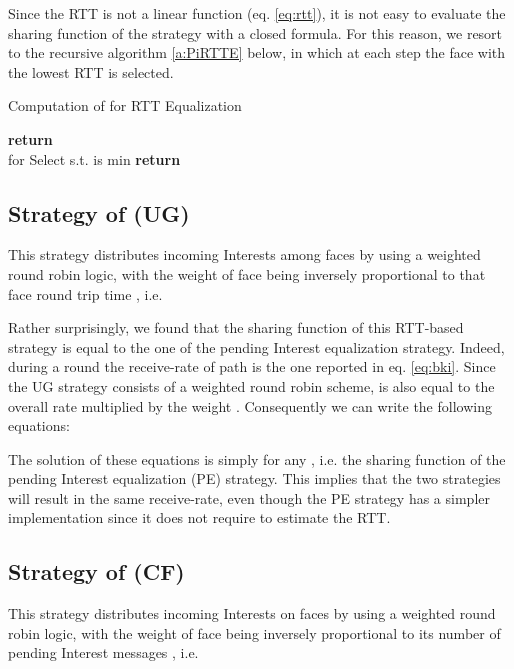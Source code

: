 \documentclass{sig-alternate-10pt}
\begin{document}
Since the RTT is not a linear function (eq. \ref{eq:rtt}), it is not easy to evaluate the sharing function  of the strategy with a closed formula. For this reason, we resort to the recursive algorithm \ref{a:PiRTTE} below, in which at each step the face with the lowest RTT is selected.



\begin{algorithm}
\caption{Computation of  for RTT Equalization}
\label{a:PiRTTE}
\begin{algorithmic}[1]
\State \textbf{return} 
\EndProcedure
\\
\State  for 
\State 
\For {}
\State Select  s.t.  is min
\State 
\EndFor
\State \textbf{return} 
\EndProcedure
\end{algorithmic}
\end{algorithm}


\subsection{Strategy of \cite{udugama} (UG)}
\label{s:ug}
This strategy distributes incoming Interests among faces by using a weighted round robin logic, with the weight  of face  being inversely proportional to that face round trip time , i.e.



Rather surprisingly, we found that the sharing function  of this RTT-based strategy is equal to the one of the pending Interest equalization strategy. Indeed, during a round  the receive-rate  of path  is the one reported in eq. \ref{eq:bki}. Since the UG strategy consists of a weighted round robin scheme,  is also equal to the overall rate  multiplied by the weight . Consequently we can write the following equations:

The solution of these equations is simply  for any , i.e. the sharing function of the pending Interest equalization (PE) strategy. This implies that the two strategies will result in the same receive-rate, even though the PE strategy has a simpler implementation since it does not require to estimate the RTT.

\subsection{Strategy of \cite{carofigliooptimal} (CF)}
\label{s:caro}
This strategy distributes incoming Interests on faces by using a weighted round robin logic, with the weight  of face  being inversely proportional to its number of pending Interest messages , i.e.
\end{document}

